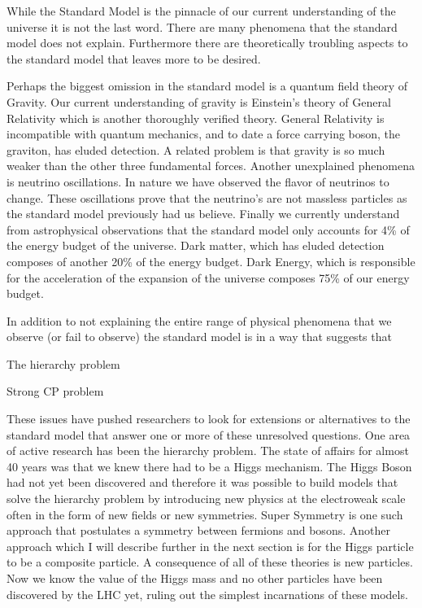 
While the Standard Model is the pinnacle of our current understanding of the universe it is not the last word.
There are many phenomena that the standard model does not explain.
Furthermore there are theoretically troubling aspects to the standard model that leaves more to be desired.

Perhaps the biggest omission in the standard model is a quantum field theory of Gravity.
Our current understanding of gravity is Einstein's theory of General Relativity which is another thoroughly verified theory.
General Relativity is incompatible with quantum mechanics, and to date a force carrying boson, the graviton, has eluded detection.
A related problem is that gravity is so much weaker than the other three fundamental forces.
Another unexplained phenomena is neutrino oscillations.
In nature we have observed the flavor of neutrinos to change.
These oscillations prove that the neutrino's are not massless particles as the standard model previously had us believe.
Finally we currently understand from astrophysical observations that the standard model only accounts for 4\% of the energy budget of the universe.
Dark matter, which has eluded detection composes of another 20\% of the energy budget.
Dark Energy, which is responsible for the acceleration of the expansion of the universe composes 75\% of our energy budget.

In addition to not explaining the entire range of physical phenomena that we observe (or fail to observe) the standard model is in a way that suggests that 

The hierarchy problem 

Strong CP problem

These issues have pushed researchers to look for extensions or alternatives to the standard model that answer one or more of these unresolved questions.
One area of active research has been the hierarchy problem.
The state of affairs for almost 40 years was that we knew there had to be a Higgs mechanism.
The Higgs Boson had not yet been discovered and therefore it was possible to build models that solve the hierarchy problem by introducing new physics at the electroweak scale often in the form of new fields or new symmetries.
Super Symmetry is one such approach that postulates a symmetry between fermions and bosons.
Another approach which I will describe further in the next section is for the Higgs particle to be a composite particle.
A consequence of all of these theories is new particles.
Now we know the value of the Higgs mass and no other particles have been discovered by the LHC yet, ruling out the simplest incarnations of these models.
